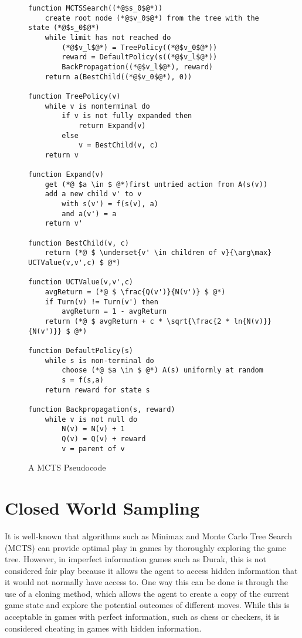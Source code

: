 \begin{figure}[h]
\captionsetup{justification=centering}
\begin{lstlisting}
function MCTSSearch((*@$s_0$@*))
	create root node (*@$v_0$@*) from the tree with the state (*@$s_0$@*)
	while limit has not reached do
		(*@$v_l$@*) = TreePolicy((*@$v_0$@*))
		reward = DefaultPolicy(s((*@$v_l$@*))
		BackPropagation((*@$v_l$@*), reward)
	return a(BestChild((*@$v_0$@*), 0))
	
function TreePolicy(v)
	while v is nonterminal do 
		if v is not fully expanded then
			return Expand(v)
		else
			v = BestChild(v, c)
	return v

function Expand(v)
	get (*@ $a \in $ @*)first untried action from A(s(v))
	add a new child v' to v
		with s(v') = f(s(v), a) 
		and a(v') = a
	return v'
	
function BestChild(v, c)
	return (*@ $ \underset{v' \in children of v}{\arg\max} UCTValue(v,v',c) $ @*)
	
function UCTValue(v,v',c)
	avgReturn = (*@ $ \frac{Q(v')}{N(v')} $ @*)
	if Turn(v) != Turn(v') then 
		avgReturn = 1 - avgReturn
	return (*@ $ avgReturn + c * \sqrt{\frac{2 * ln{N(v)}}{N(v')}} $ @*)
	
function DefaultPolicy(s)
	while s is non-terminal do
		choose (*@ $a \in $ @*) A(s) uniformly at random
		s = f(s,a)
	return reward for state s

function Backpropagation(s, reward)
	while v is not null do
		N(v) = N(v) + 1
		Q(v) = Q(v) + reward
		v = parent of v
\end{lstlisting}
\caption{A MCTS Pseudocode}
\label{fig:mctsREST}
\end{figure}


\section{Closed World Sampling}

It is well-known that algorithms such as Minimax and Monte Carlo Tree Search (MCTS) can provide optimal play in games by thoroughly exploring the game tree. However, in imperfect information games such as Durak, this is not considered fair play because it allows the agent to access hidden information that it would not normally have access to. One way this can be done is through the use of a cloning method, which allows the agent to create a copy of the current game state and explore the potential outcomes of different moves. While this is acceptable in games with perfect information, such as chess or checkers, it is considered cheating in games with hidden information.

